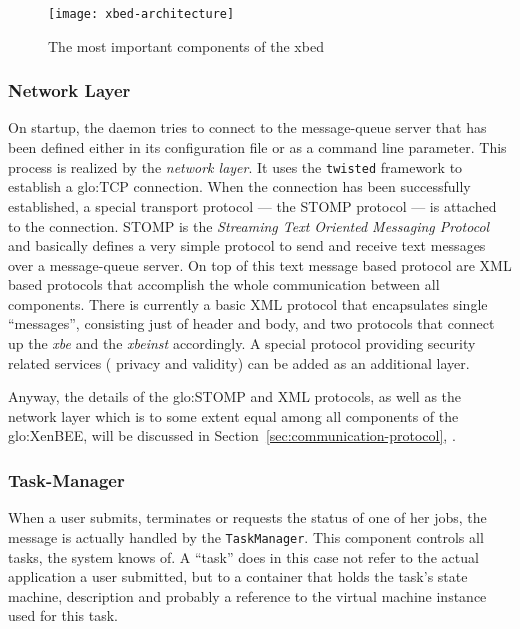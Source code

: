 \begin{figure}[ht]
  \centering
  \texttt{[image: xbed-architecture]}
  \caption[Components of the xbed]{The most important components of the xbed}
  \label{fig:xbed-architecture}
\end{figure}

\subsubsection{Network Layer}

On startup, the  daemon tries to connect to  the message-queue server that
has been  defined either in  its configuration file  or as a  command line
parameter. This process  is realized by the \emph{network  layer}. It uses
the  \texttt{twisted} framework to  establish a  \gls{glo:TCP} connection.
When the connection has been successfully established, a special transport
protocol  --- the  STOMP  protocol  \cite{stomp} ---  is  attached to  the
connection. STOMP is the \emph{Streaming Text Oriented Messaging Protocol}
and  basically defines a  very simple  protocol to  send and  receive text
messages over a  message-queue server.  On top of  this text message based
protocol are  XML based protocols that accomplish  the whole communication
between  all components.   There is  currently a  basic XML  protocol that
encapsulates single ``messages'', consisting  just of header and body, and
two  protocols  that connect  up  the  \emph{xbe}  and the  \emph{xbeinst}
accordingly.  A special protocol  providing security related services (\ie
privacy and validity) can be added as an additional layer.

Anyway, the details  of the \gls{glo:STOMP} and XML  protocols, as well as
the network  layer which is to  some extent equal among  all components of
the        \gls{glo:XenBEE},       will       be        discussed       in
Section~\ref{sec:communication-protocol},
\emph{}.

\subsubsection{Task-Manager}

When a  user submits,  terminates or  requests the status  of one  of her
jobs, the  message is actually handled by  the \texttt{TaskManager}.  This
component controls all tasks, the system knows of. A ``task'' does in this
case  not refer  to the  actual application  a user  submitted, but  to a
container that holds the task's  state machine, description and probably a
reference to the virtual machine instance used for this task.


